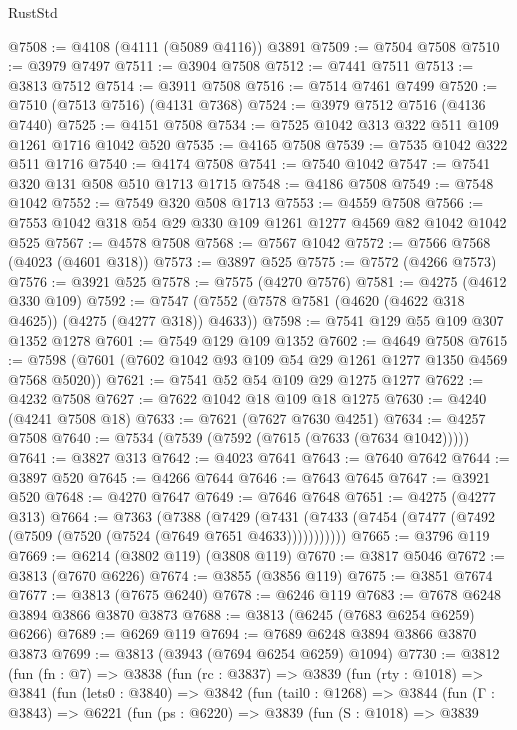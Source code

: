 \begin{lexlean}{RustStd}
\begin{coremodule}
@7508 := @4108 (@4111 (@5089 @4116)) @3891
@7509 := @7504 @7508
@7510 := @3979 @7497
@7511 := @3904 @7508
@7512 := @7441 @7511
@7513 := @3813 @7512
@7514 := @3911 @7508
@7516 := @7514 @7461 @7499
@7520 := @7510 (@7513 @7516) (@4131 @7368)
@7524 := @3979 @7512 @7516 (@4136 @7440)
@7525 := @4151 @7508
@7534 := @7525 @1042 @313 @322 @511 @109 @1261 @1716 @1042 @520
@7535 := @4165 @7508
@7539 := @7535 @1042 @322 @511 @1716
@7540 := @4174 @7508
@7541 := @7540 @1042
@7547 := @7541 @320 @131 @508 @510 @1713 @1715
@7548 := @4186 @7508
@7549 := @7548 @1042
@7552 := @7549 @320 @508 @1713
@7553 := @4559 @7508
@7566 := @7553 @1042 @318 @54 @29 @330 @109 @1261 @1277 @4569 @82 @1042 @1042 @525
@7567 := @4578 @7508
@7568 := @7567 @1042
@7572 := @7566 @7568 (@4023 (@4601 @318))
@7573 := @3897 @525
@7575 := @7572 (@4266 @7573)
@7576 := @3921 @525
@7578 := @7575 (@4270 @7576)
@7581 := @4275 (@4612 @330 @109)
@7592 := @7547 (@7552 (@7578 @7581 (@4620 (@4622 @318 @4625)) (@4275 (@4277 @318)) @4633))
@7598 := @7541 @129 @55 @109 @307 @1352 @1278
@7601 := @7549 @129 @109 @1352
@7602 := @4649 @7508
@7615 := @7598 (@7601 (@7602 @1042 @93 @109 @54 @29 @1261 @1277 @1350 @4569 @7568 @5020))
@7621 := @7541 @52 @54 @109 @29 @1275 @1277
@7622 := @4232 @7508
@7627 := @7622 @1042 @18 @109 @18 @1275
@7630 := @4240 (@4241 @7508 @18)
@7633 := @7621 (@7627 @7630 @4251)
@7634 := @4257 @7508
@7640 := @7534 (@7539 (@7592 (@7615 (@7633 (@7634 @1042)))))
@7641 := @3827 @313
@7642 := @4023 @7641
@7643 := @7640 @7642
@7644 := @3897 @520
@7645 := @4266 @7644
@7646 := @7643 @7645
@7647 := @3921 @520
@7648 := @4270 @7647
@7649 := @7646 @7648
@7651 := @4275 (@4277 @313)
@7664 := @7363
    (@7388
      (@7429 (@7431 (@7433 (@7454 (@7477 (@7492 (@7509 (@7520 (@7524 (@7649 @7651 @4633)))))))))))
@7665 := @3796 @119
@7669 := @6214 (@3802 @119) (@3808 @119)
@7670 := @3817 @5046
@7672 := @3813 (@7670 @6226)
@7674 := @3855 (@3856 @119)
@7675 := @3851 @7674
@7677 := @3813 (@7675 @6240)
@7678 := @6246 @119
@7683 := @7678 @6248 @3894 @3866 @3870 @3873
@7688 := @3813 (@6245 (@7683 @6254 @6259) @6266)
@7689 := @6269 @119
@7694 := @7689 @6248 @3894 @3866 @3870 @3873
@7699 := @3813 (@3943 (@7694 @6254 @6259) @1094)
@7730 := @3812
    (fun (fn : @7) =>
    @3838
      (fun (rc : @3837) =>
      @3839
        (fun (rty : @1018) =>
        @3841
          (fun (lets0 : @3840) =>
          @3842
            (fun (tail0 : @1268) =>
            @3844
              (fun (Γ : @3843) =>
              @6221
                (fun (ps : @6220) =>
                @3839
                  (fun (S : @1018) =>
                  @3839

\end{coremodule}
\end{lexlean}
